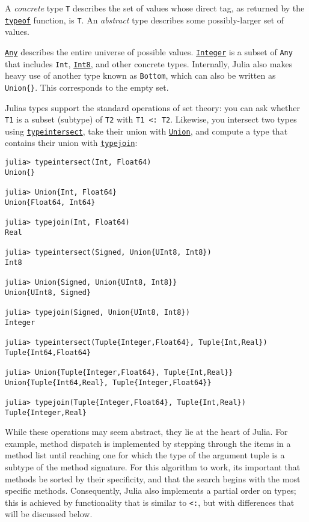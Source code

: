 A \emph{concrete} type \texttt{T} describes the set of values whose direct tag, as returned by the \hyperlink{13440452181855594120}{\texttt{typeof}} function, is \texttt{T}. An \emph{abstract} type describes some possibly-larger set of values.



\hyperlink{15014186392807667022}{\texttt{Any}} describes the entire universe of possible values. \hyperlink{8469131683393450448}{\texttt{Integer}} is a subset of \texttt{Any} that includes \texttt{Int}, \hyperlink{5857518405103968275}{\texttt{Int8}}, and other concrete types. Internally, Julia also makes heavy use of another type known as \texttt{Bottom}, which can also be written as \texttt{Union\{\}}. This corresponds to the empty set.



Julia{\textquotesingle}s types support the standard operations of set theory: you can ask whether \texttt{T1} is a {\textquotedbl}subset{\textquotedbl} (subtype) of \texttt{T2} with \texttt{T1 <: T2}. Likewise, you intersect two types using \hyperlink{1869272868531275554}{\texttt{typeintersect}}, take their union with \hyperlink{5087820771052303592}{\texttt{Union}}, and compute a type that contains their union with \hyperlink{6895589781245489183}{\texttt{typejoin}}:




\begin{verbatim}
julia> typeintersect(Int, Float64)
Union{}

julia> Union{Int, Float64}
Union{Float64, Int64}

julia> typejoin(Int, Float64)
Real

julia> typeintersect(Signed, Union{UInt8, Int8})
Int8

julia> Union{Signed, Union{UInt8, Int8}}
Union{UInt8, Signed}

julia> typejoin(Signed, Union{UInt8, Int8})
Integer

julia> typeintersect(Tuple{Integer,Float64}, Tuple{Int,Real})
Tuple{Int64,Float64}

julia> Union{Tuple{Integer,Float64}, Tuple{Int,Real}}
Union{Tuple{Int64,Real}, Tuple{Integer,Float64}}

julia> typejoin(Tuple{Integer,Float64}, Tuple{Int,Real})
Tuple{Integer,Real}
\end{verbatim}



While these operations may seem abstract, they lie at the heart of Julia.  For example, method dispatch is implemented by stepping through the items in a method list until reaching one for which the type of the argument tuple is a subtype of the method signature. For this algorithm to work, it{\textquotesingle}s important that methods be sorted by their specificity, and that the search begins with the most specific methods. Consequently, Julia also implements a partial order on types; this is achieved by functionality that is similar to \texttt{<:}, but with differences that will be discussed below.



